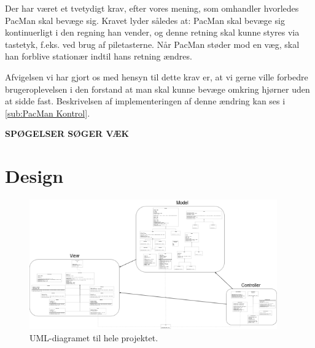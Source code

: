 \documentclass{article}
\theoremstyle{mytheoremstyle}
\theoremstyle{mytheoremstyle}
\theoremstyle{myproblemstyle}
\begin{document}
Der har været et tvetydigt krav, efter vores mening, som omhandler hvorledes
PacMan skal bevæge sig. Kravet lyder således at: PacMan skal bevæge sig
kontinuerligt i den regning han vender, og denne retning skal kunne styres via
tastetyk, f.eks. ved brug af piletasterne. Når PacMan støder mod en væg, skal
han forblive stationær indtil hans retning ændres.

Afvigelsen vi har gjort os med hensyn til dette krav er, at vi gerne ville
forbedre brugeroplevelsen i den forstand at man skal kunne bevæge omkring
hjørner uden at sidde fast. Beskrivelsen af implementeringen af denne ændring
kan ses i \autoref{sub:PacMan Kontrol}.

\textbf{SPØGELSER SØGER VÆK}


\newpage

\section{Design}\label{sec:Design} %

\begin{figure}[H]
    \begin{center}
        \includegraphics[width=0.95\textwidth]{figures/UML-diagram.png}
    \end{center}
    \caption{UML-diagramet til hele projektet.}
    \label{UML-diagram}
\end{figure}
\end{document}
